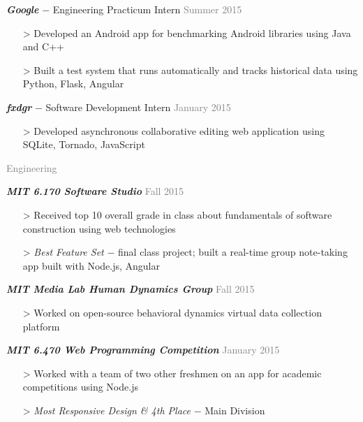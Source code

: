 \documentclass[11pt]{article}
\newcommand{\rsection}[1]{\vspace{1.5em}\textcolor{gray}{\Large \robotoslab #1}\vspace{0.5em}}
\newcommand{\bt}[1]{\textit{\textbf{#1}}} %
\newcommand{\gap}[0]{\vspace{0.5em}} %
\newcommand{\dash}[0]{ $-$ } %
\newcommand{\gray}[1]{\textcolor{gray}{#1}}
\newcommand{\e}[0]{> }
\begin{document}
\gap

\bt{Google}\dash Engineering Practicum Intern \hfill \gray{Summer 2015}

\begin{itemize}
\item[\e] Developed an Android app for benchmarking Android libraries using Java and C++
\item[\e] Built a test system that runs automatically and tracks historical data using Python, Flask, Angular
\end{itemize}

\gap

\bt{fxdgr}\dash Software Development Intern \hfill \gray{January 2015}

\begin{itemize}
\item[\e] Developed asynchronous collaborative editing web application using SQLite, Tornado, JavaScript
\end{itemize}

\rsection{Engineering}

\bt{MIT 6.170 Software Studio} \hfill \gray{Fall 2015}

\begin{itemize}
\item[\e] Received top 10 overall grade in class about fundamentals of software construction using web technologies
\item[\e] \textit{Best Feature Set}\dash final class project; built a real-time group note-taking app built with Node.js, Angular
\end{itemize}

\gap

\bt{MIT Media Lab Human Dynamics Group} \hfill \gray{Fall 2015}

\begin{itemize}
\item[\e] Worked on open-source behavioral dynamics virtual data collection platform
\end{itemize}

\gap

\bt{MIT 6.470 Web Programming Competition} \hfill \gray{January 2015}

\begin{itemize}
\item[\e] Worked with a team of two other freshmen on an app for academic competitions using Node.js
\item[\e] \textit{Most Responsive Design \& 4th Place}\dash Main Division
\end{itemize}
\end{document}
